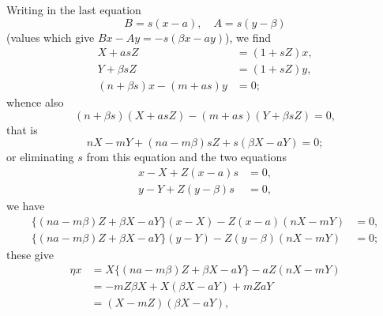 \documentclass[11pt,a4paper]{article}
\theoremstyle{plain}
\begin{document}
Writing in the last equation
\[
B = s(x - a), \quad A = s(y - \beta)
\]
(values which give $Bx - Ay = -s(\beta x - ay)$), we find
\begin{align*}
X + asZ &= (1 + sZ)x, \\
Y + \beta sZ &= (1 + sZ)y, \\
(n + \beta s)x - (m + as)y &= 0;
\end{align*}
whence also
\[
(n + \beta s)(X + asZ) - (m + as)(Y + \beta sZ) = 0,
\]
that is
\[
nX - mY + (na - m\beta)sZ + s(\beta X - aY) = 0;
\]
or eliminating $s$ from this equation and the two equations
\begin{align*}
x - X + Z(x - a)s &= 0, \\
y - Y + Z(y - \beta)s &= 0,
\end{align*}
we have
\begin{align*}
\{(na - m\beta)Z + \beta X - aY\}(x - X) - Z(x - a)(nX - mY) &= 0, \\
\{(na - m\beta)Z + \beta X - aY\}(y - Y) - Z(y - \beta)(nX - mY) &= 0;
\end{align*}
these give
\begin{align*}
\eta x &= X\{(na - m\beta)Z + \beta X - aY\} - aZ(nX - mY) \\
&= -mZ\beta X + X(\beta X - aY) + mZaY \\
&= (X - mZ)(\beta X - aY),
\end{align*}
\end{document}
